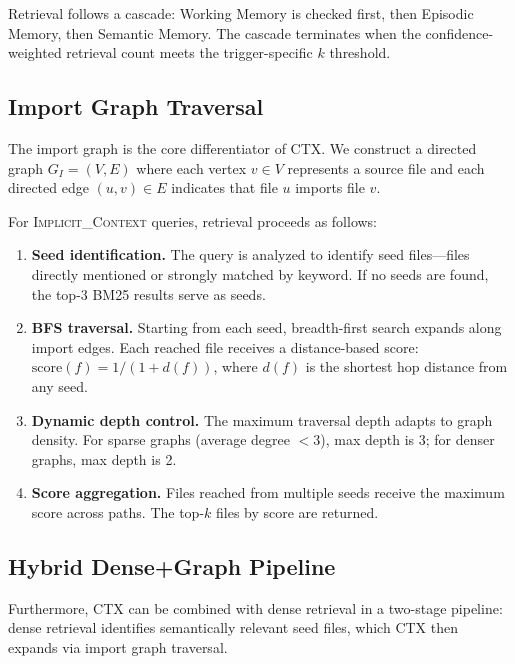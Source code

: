 \documentclass[11pt]{article}
\begin{document}
Retrieval follows a cascade: Working Memory is checked first, then Episodic Memory, then Semantic Memory. The cascade terminates when the confidence-weighted retrieval count meets the trigger-specific $k$ threshold.

\subsection{Import Graph Traversal}

The import graph is the core differentiator of CTX. We construct a directed graph $G_I = (V, E)$ where each vertex $v \in V$ represents a source file and each directed edge $(u, v) \in E$ indicates that file $u$ imports file $v$.

For \textsc{Implicit\_Context} queries, retrieval proceeds as follows:

\begin{enumerate}
\item \textbf{Seed identification.} The query is analyzed to identify seed files---files directly mentioned or strongly matched by keyword. If no seeds are found, the top-3 BM25 results serve as seeds.

\item \textbf{BFS traversal.} Starting from each seed, breadth-first search expands along import edges. Each reached file receives a distance-based score: $\text{score}(f) = 1 / (1 + d(f))$, where $d(f)$ is the shortest hop distance from any seed.

\item \textbf{Dynamic depth control.} The maximum traversal depth adapts to graph density. For sparse graphs (average degree $< 3$), max depth is 3; for denser graphs, max depth is 2.

\item \textbf{Score aggregation.} Files reached from multiple seeds receive the maximum score across paths. The top-$k$ files by score are returned.
\end{enumerate}

\subsection{Hybrid Dense+Graph Pipeline}
\label{sec:hybrid}

Furthermore, CTX can be combined with dense retrieval in a two-stage pipeline: dense retrieval identifies semantically relevant seed files, which CTX then expands via import graph traversal.
\end{document}
